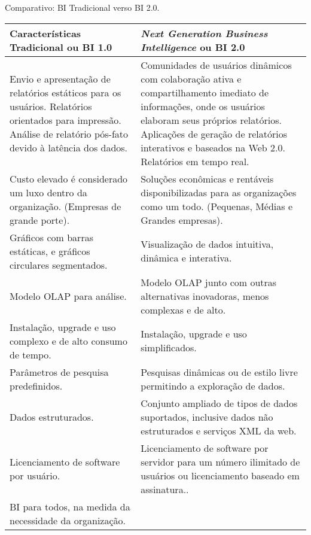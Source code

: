 \begin{quadro}[H]
	\begin{center}
		\caption{Comparativo: BI Tradicional verso BI 2.0.\label{qua:quadro-02}}
	    \begin{tabular}{ |p{7cm}|p{7cm}| }
			\hline
		    Características Tradicional ou BI 1.0  
		    & 
            \textit{Next Generation Business Intelligence} ou BI 2.0 
            \\
		    \hline
            Envio e apresentação de relatórios estáticos para os usuários. Relatórios orientados para impressão. Análise de relatório pós-fato devido à latência dos dados. 
            &
            Comunidades de usuários dinâmicos com colaboração ativa e compartilhamento imediato de informações, onde os usuários elaboram seus próprios relatórios. Aplicações de geração de relatórios interativos e baseados na Web 2.0. Relatórios em tempo real. 
            \\
            \hline
            Custo elevado é considerado um luxo dentro da organização. (Empresas de grande porte). 
            &
            Soluções econômicas e rentáveis disponibilizadas para as organizações como um todo. (Pequenas, Médias e Grandes empresas).
            \\
            \hline
            Gráficos com barras estáticas, e gráficos circulares segmentados. 
            &
            Visualização de dados intuitiva, dinâmica e interativa.
            \\
            \hline
            Modelo OLAP para análise. 
            &
            Modelo OLAP junto com outras alternativas inovadoras, menos complexas e de alto.
            \\
            \hline
            Instalação, upgrade e uso complexo e de alto consumo de tempo. 
            &
            Instalação, upgrade e uso simplificados.
            \\
            \hline
            Parâmetros de pesquisa predefinidos. 
            &
            Pesquisas dinâmicas ou de estilo livre permitindo a exploração de dados.
            \\
            \hline
            Dados estruturados. 
            &
            Conjunto ampliado de tipos de dados suportados, inclusive dados não estruturados e serviços XML da web.
            \\
            \hline
            Licenciamento de software por usuário. 
            &
            Licenciamento de software por servidor para um número ilimitado de usuários ou licenciamento baseado em assinatura..
            \\
            \hline
            BI para todos, na medida da necessidade da organização.
            \\
           \hline
	    \end{tabular}
	\end{center}
	\vspace*{-0,8cm}
	{\raggedright {}}
\end{quadro}
